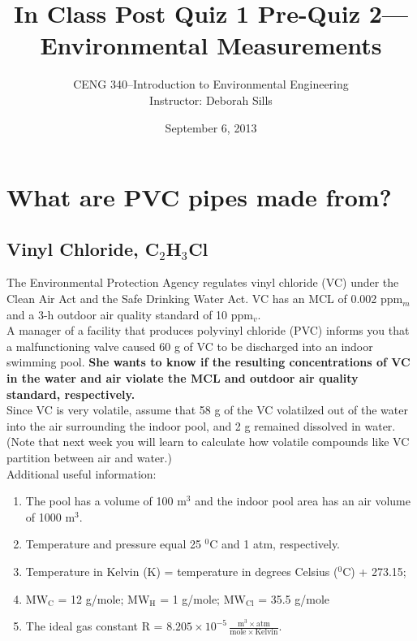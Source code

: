 \documentclass[12pt,letterpaper]{article}
\begin{document}
\setlength{\parindent}{0cm} 


\frenchspacing


\title {\Large In Class Post Quiz 1 Pre-Quiz 2---Environmental Measurements} 
\author {CENG 340--Introduction to Environmental Engineering\\
Instructor: Deborah Sills}
\date {September 6, 2013}
\maketitle


\section *{What are PVC pipes made from?}

\subsection *{Vinyl Chloride, C$_2$H$_3$Cl}

The Environmental Protection Agency regulates vinyl chloride (VC) under the Clean Air Act and the Safe Drinking Water Act.  VC has an MCL of 0.002 ppm$_m$ and a 3-h outdoor air quality standard of 10 ppm$_v$.\\

A manager of a facility that produces polyvinyl chloride (PVC) informs you that a malfunctioning valve caused 60 g of VC to be discharged into an indoor swimming pool. \textbf{She wants to know if the resulting concentrations of VC in the water and air violate the MCL and outdoor air quality standard, respectively.}\\  

Since VC is very volatile, assume that 58 g of the VC volatilzed out of the water into the air surrounding the indoor pool, and 2 g remained dissolved in water.  (Note that next week you will learn to calculate how volatile compounds like VC partition between air and water.)\\

Additional useful information:

\begin{enumerate}

\item The pool has a volume of 100 m$^3$ and the indoor pool area has an air volume of 1000 m$^3$. 

\item Temperature and pressure equal 25 $^0$C and 1 atm, respectively.

\item Temperature in Kelvin (K) = temperature in degrees Celsius ($^0$C) + 273.15; 

\item MW$\mathrm{_C}$ = 12 g/mole; MW$\mathrm{_H}$ = 1 g/mole; MW$\mathrm{_{Cl}}$ = 35.5 g/mole

\item The ideal gas constant R = $8.205\times 10^{-5}\, \mathrm{\frac{m^3 \times atm}{mole \times Kelvin}}$. 


\end{enumerate}
\end{document}
